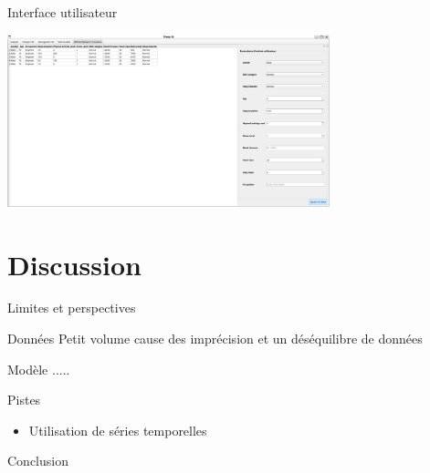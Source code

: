 \documentclass{beamer}
\begin{document}
\begin{frame}{Interface utilisateur}
  \begin{center}
    \includegraphics[width=0.7\textwidth]{screen_UI.png}
  \end{center}
\end{frame}

\section{Discussion}

\begin{frame}{Limites et perspectives}
    \begin{block}{Données}
        Petit volume cause des imprécision et un déséquilibre de données
    \end{block}
    \begin{block}{Modèle}
         .....
    \end{block}
    \begin{block}{Pistes}
    \begin{itemize}
      \item Utilisation de séries temporelles
    \end{itemize}
    \end{block}
    
\end{frame}

\begin{frame}{Conclusion}
\end{frame}
\end{document}

